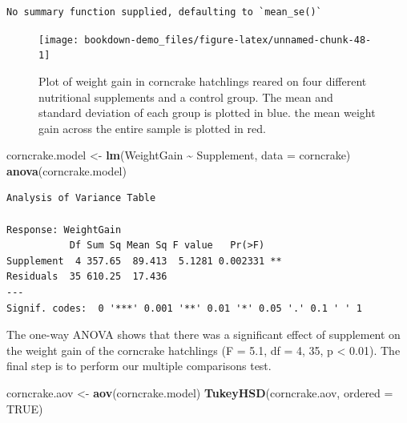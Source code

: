 \documentclass[
]{book}
\newenvironment{Shaded}{\begin{snugshade}}{\end{snugshade}}
\newcommand{\DataTypeTok}[1]{\textcolor[rgb]{0.13,0.29,0.53}{#1}}
\newcommand{\KeywordTok}[1]{\textcolor[rgb]{0.13,0.29,0.53}{\textbf{#1}}}
\newcommand{\NormalTok}[1]{#1}
\newcommand{\OperatorTok}[1]{\textcolor[rgb]{0.81,0.36,0.00}{\textbf{#1}}}
\newcommand{\OtherTok}[1]{\textcolor[rgb]{0.56,0.35,0.01}{#1}}
\newcommand{\StringTok}[1]{\textcolor[rgb]{0.31,0.60,0.02}{#1}}
\begin{document}
\begin{verbatim}
No summary function supplied, defaulting to `mean_se()`
\end{verbatim}

\begin{figure}[H]

{\centering \texttt{[image: bookdown-demo\_files/figure-latex/unnamed-chunk-48-1]} 

}

\caption{Plot of weight gain in corncrake hatchlings reared on four different nutritional supplements and a control group. The mean and standard deviation of each group is plotted in blue. the mean weight gain across the entire sample is plotted in red.}\label{fig:unnamed-chunk-48}
\end{figure}

\begin{Shaded}
\begin{Highlighting}[]
\NormalTok{corncrake.model \textless{}{-}}\StringTok{ }\KeywordTok{lm}\NormalTok{(WeightGain }\OperatorTok{\textasciitilde{}}\StringTok{ }\NormalTok{Supplement, }\DataTypeTok{data =}\NormalTok{ corncrake)}
\KeywordTok{anova}\NormalTok{(corncrake.model)}
\end{Highlighting}
\end{Shaded}

\begin{verbatim}
Analysis of Variance Table

Response: WeightGain
           Df Sum Sq Mean Sq F value   Pr(>F)   
Supplement  4 357.65  89.413  5.1281 0.002331 **
Residuals  35 610.25  17.436                    
---
Signif. codes:  0 '***' 0.001 '**' 0.01 '*' 0.05 '.' 0.1 ' ' 1
\end{verbatim}

The one-way ANOVA shows that there was a significant effect of supplement on the weight gain of the corncrake hatchlings (F = 5.1, df = 4, 35, p \textless{} 0.01). The final step is to perform our multiple comparisons test.

\begin{Shaded}
\begin{Highlighting}[]
\NormalTok{corncrake.aov \textless{}{-}}\StringTok{ }\KeywordTok{aov}\NormalTok{(corncrake.model)}
\KeywordTok{TukeyHSD}\NormalTok{(corncrake.aov, }\DataTypeTok{ordered =} \OtherTok{TRUE}\NormalTok{)}
\end{Highlighting}
\end{Shaded}
\end{document}
